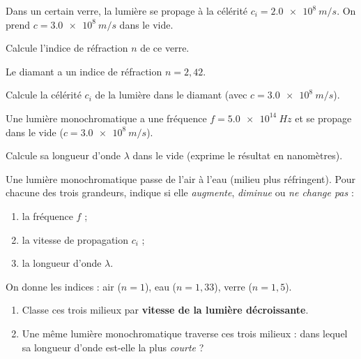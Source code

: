 \documentclass[11pt,a4paper]{article}
\begin{document}
\begin{exo}
Dans un certain verre, la lumière se propage à la célérité $c_i=\qty{2.0e8}{m/s}$. On prend
$c=\qty{3.0e8}{m/s}$ dans le vide.

Calcule l'indice de réfraction $n$ de ce verre.
\end{exo}

\begin{exo}
Le diamant a un indice de réfraction $n=2{,}42$.

Calcule la célérité $c_i$ de la lumière dans le diamant (avec $c=\qty{3.0e8}{m/s}$).
\end{exo}

\begin{exo}
Une lumière monochromatique a une fréquence $f=\qty{5.0e14}{Hz}$ et se propage dans le vide
($c=\qty{3.0e8}{m/s}$).

Calcule sa longueur d'onde $\lambda$ dans le vide (exprime le résultat en nanomètres).
\end{exo}

\begin{exo}
Une lumière monochromatique passe de l'air à l'eau (milieu plus réfringent). Pour chacune des trois
grandeurs, indique si elle \emph{augmente}, \emph{diminue} ou \emph{ne change pas} :
\begin{enumerate}[label=\alph*)]
  \item la fréquence $f$ ;
  \item la vitesse de propagation $c_i$ ;
  \item la longueur d'onde $\lambda$.
\end{enumerate}
\end{exo}

\begin{exo}
On donne les indices : air ($n=1$), eau ($n=1{,}33$), verre ($n=1{,}5$).
\begin{enumerate}[label=\alph*)]
  \item Classe ces trois milieux par \textbf{vitesse de la lumière décroissante}.
  \item Une même lumière monochromatique traverse ces trois milieux : dans lequel sa longueur d'onde
        est-elle la plus \emph{courte} ?
\end{enumerate}
\end{exo}
\end{document}
